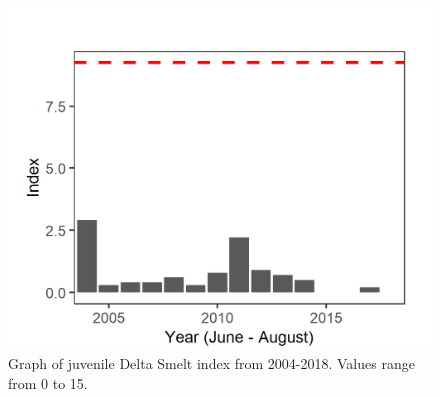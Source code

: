 \documentclass[
]{book}
\begin{document}
\begin{panel-grid}
\begin{columns-nocenter}
\begin{column800}

\begin{expand}

\begin{figure}
\includegraphics[width=15.25in]{figures/STN_DSM_rec} \caption{Graph of juvenile Delta Smelt index from 2004-2018. Values range from 0 to 15.}\label{fig:unnamed-chunk-88}
\end{figure}

\end{expand}

\end{column800}

\begin{column40}

~

\end{column40}

\begin{column800}

\begin{expand}


\end{expand}
\end{column800}
\end{columns-nocenter}
\end{panel-grid}
\end{document}
